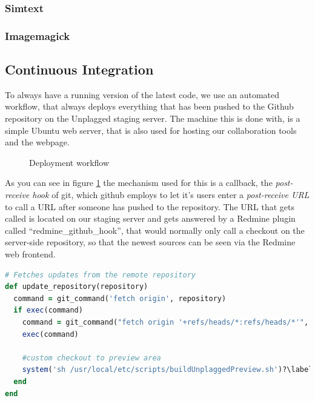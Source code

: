\subsubsection{Simtext}
\subsubsection{Imagemagick}

\subsection{Continuous Integration}

To always have a running version of the latest code, we use an automated workflow, that always deploys everything that 
has been pushed to the Github repository on the Unplagged staging server. The machine this is done with, is a simple 
Ubuntu web server, that is also used for hosting our collaboration tools and the webpage.

\begin{figure}[!h]
  \centering
  \caption{Deployment workflow}
  \label{fig:developmentWorkflow}
\end{figure}

As you can see in figure \ref{fig:developmentWorkflow} the mechanism used for this is a callback, the 
\textit{post-receive hook} of git, 
which github employs to let it's users enter a \textit{post-receive URL} to call a URL after someone has pushed to the
repository. The URL that gets called is located on our staging server and gets answered by a Redmine plugin called 
\enquote{redmine\_github\_hook}, that would
normally only call a checkout on the server-side repository, so that the newest sources can be seen via the Redmine
web frontend. 

\begin{lstlisting}[caption=Changes to redmine\_github\_hook.rb, label=list:redmineGithubHook, language=Ruby]
# Fetches updates from the remote repository
def update_repository(repository)
  command = git_command('fetch origin', repository)
  if exec(command)
    command = git_command("fetch origin '+refs/heads/*:refs/heads/*'", repository)
    exec(command)

    #custom checkout to preview area
    system('sh /usr/local/etc/scripts/buildUnplaggedPreview.sh')?\label{customRubyChange}?
  end
end
\end{lstlisting}

